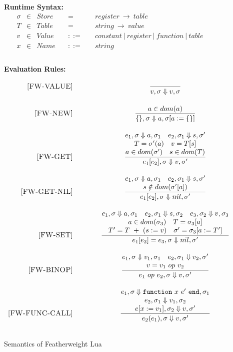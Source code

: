 \documentclass{article}
\begin{document}
\begin{figure}[P]
\caption{Semantics of Featherweight Lua}
{\bf Runtime Syntax:}
\label{fig:FW2Sem}
\[
\begin{array}{rclcl}
  \sigma & \in & {Store} \quad  & = & \quad {register} ~\rightarrow ~{table} \\
  T & \in & {Table} \quad  & = & \quad {string} ~\rightarrow ~{value} \\
  v & \in & {Value} \quad & ::= & \quad constant~|~ register ~|~ function~|~table \\
  x & \in & {Name} \quad & ::= & \quad string \\
  \\
\end{array}
\]

{\bf Evaluation Rules:~~~ } \\
\[
\begin{array}{r@{\qquad\qquad}c}
\ssrule{FW-VALUE}{
}{
  \semanticFull {v}{\sigma} {v}{\sigma}
}
\ssrule{FW-NEW}{
  a \in dom(a)
}{
  \semanticFull{\{\}}{\sigma}{a}{\sigma[a := \{\}]}
}
\ssrule{FW-GET}{
  \semanticFull{e_1}{\sigma}{a}{\sigma_1} \quad
  \semanticFull{e_2}{\sigma_1}{s}{\sigma'} \\
  T = \sigma'(a)\quad
  v = T[s]\\
  a \in dom(\sigma') \quad
  s \in dom(T)\\
  
}{
  \semanticFull{e_1[e_2]}{\sigma}{v}{\sigma'}
}
\ssrule{FW-GET-NIL}{
  \semanticFull{e_1}{\sigma}{a}{\sigma_1} \quad
  \semanticFull{e_2}{\sigma_1}{s}{\sigma'} \\
  s \notin dom(\sigma'[a]) 
}{
  \semanticFull{e_1[e_2]}{\sigma}{nil}{\sigma'}
}
\ssrule{FW-SET}{
  \semanticFull{e_1}{\sigma}{a}{\sigma_1} \quad
  \semanticFull{e_2}{\sigma_1}{s}{\sigma_2} \quad
  \semanticFull{e_3}{\sigma_2}{v}{\sigma_3} \\
  a \in dom({\sigma}_3) \quad
  T = \sigma_3[a]\\
  T' = T~+~(s := v)\quad
  \sigma' = \sigma_3[a:=T']
}{
  \semanticFull{e_1[e_2] = e_3}{\sigma}{nil}{\sigma'}
}
\ssrule{FW-BINOP}{
  \semanticFull{e_1}{\sigma}{v_1}{\sigma_1} \quad
  \semanticFull{e_2}{\sigma_1}{v_2}{\sigma'} \\
  v = v_1 ~op~ v_2
}{
  \semanticFull{e_1 ~op~ e_2}{\sigma}{v}{\sigma'}
}
\ssrule{FW-FUNC-CALL}{
  \semanticFull{e_1}{\sigma}{{\tt function} ~x ~e' ~{\tt end}}{\sigma_1} \\
  \semanticFull{e_2}{\sigma_1}{v_1}{\sigma_2} \\
  \semanticFull{e[x:=v_1]}{\sigma_2}{v}{\sigma'} 
}{
  \semanticFull{e_2(e_1)}{\sigma}{v}{\sigma'} 
}
\end{array}
\]
\end{figure}
\end{document}
